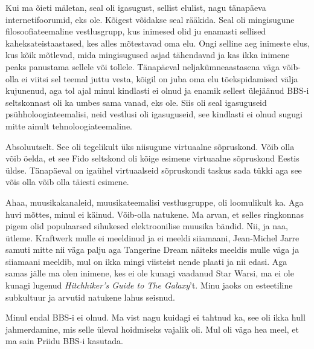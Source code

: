 \label{sisu!inimeseks}Kui ma õieti mäletan, seal oli igasugust, sellist elulist, nagu tänapäeva 
internetifoorumid, eks ole. Kõigest võidakse seal rääkida. Seal oli mingisugune 
filosoofiateemaline  vestlusgrupp, kus  inimesed olid ju enamasti sellised 
kaheksateistaastased, kes alles mõtestavad oma elu. Ongi selline aeg inimeste 
elus, kus kõik mõtlevad, mida  mingisugused asjad tähendavad ja kas ikka inimene 
peaks panustama sellele või tollele. Tänapäeval neljakümneaastasena väga 
võib-olla ei viitsi sel teemal juttu vesta, kõigil on juba oma elu 
tõekspidamised välja kujunenud, aga tol ajal minul kindlasti ei olnud ja enamik 
sellest ülejäänud BBS-i seltskonnast oli ka umbes sama vanad, eks ole. Siis oli 
seal igasuguseid psühholoogiateemalisi, neid vestlusi oli igasuguseid, see 
kindlasti ei olnud sugugi mitte ainult tehnoloogiateemaline. 


Absoluutselt. See oli tegelikult üks niisugune virtuaalne sõpruskond.  Võib 
olla võib öelda, et see Fido seltskond oli kõige esimene virtuaalne sõpruskond 
Eestis üldse. Tänapäeval on  igaühel virtuaalseid sõpruskondi taskus sada tükki 
aga see võis olla võib olla täiesti esimene.


Ahaa, muusikakanaleid, muusikateemalisi  vestlusgruppe,  oli loomulikult ka. 
Aga huvi mõttes, minul ei käinud. Võib-olla natukene. Ma arvan, et  selles ringkonnas pigem olid 
populaarsed sihukesed elektroonilise muusika bändid. Nii, ja naa, ütleme. 
Kraftwerk mulle ei meeldinud ja ei meeldi siiamaani, Jean-Michel Jarre samuti 
mitte nii väga palju aga Tangerine Dream näiteks meeldis mulle väga ja 
siiamaani meeldib, mul on ikka mingi viisteist nende plaati ja nii edasi. Aga 
samas jälle ma olen inimene, kes ei ole kunagi vaadanud Star Warsi, ma ei ole 
kunagi lugenud \emph{Hitchhiker's Guide to The Galaxy}'t. Minu jaoks  on 
esteetiline subkultuur ja arvutid natukene lahus seisnud.


Minul endal BBS-i ei olnud. Ma vist nagu kuidagi ei tahtnud ka, see oli ikka hull 
jahmerdamine, mis selle üleval hoidmiseks vajalik oli. 
Mul oli väga hea meel, et ma sain  Priidu BBS-i kasutada.

